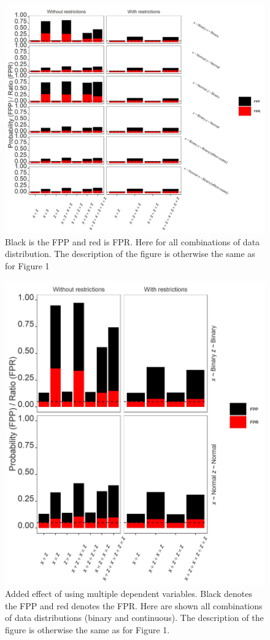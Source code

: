 \begin{figure}[ht]
\includegraphics{R/Analysis/Result/Figures/Figure1ASI.jpeg}
\centering
\caption{Black is the FPP and red is FPR.  Here for all combinations of data distribution. The description of the figure is otherwise the same as for Figure 1}
\label{fig:mainfigure}
\end{figure}

\begin{figure}[ht]
\includegraphics{R/Analysis/Result/Figures/Figure3SI.jpeg}
\centering
\caption{Added effect of using multiple dependent variables. Black denotes the FPP and red denotes the FPR. Here are shown  all combinations of data distributions (binary and continuous). The description of the figure is otherwise the same as for Figure 1.}
\label{fig:mainfigure}
\end{figure}


